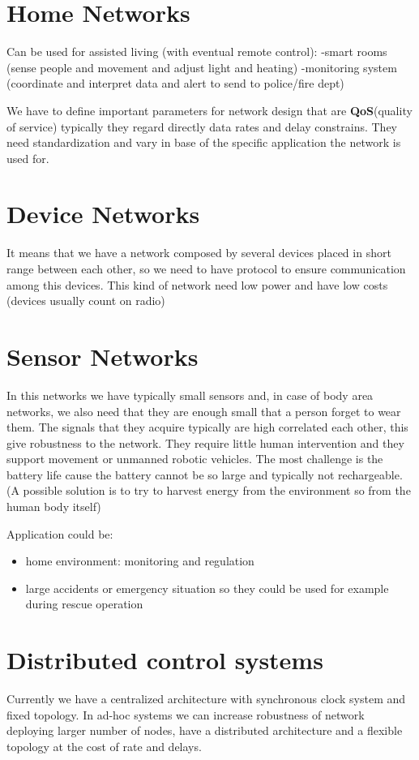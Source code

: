 \section{Home Networks}
Can be used for assisted living (with eventual remote control):
-smart rooms  (sense people and movement and adjust light and heating)
-monitoring system (coordinate and interpret data and alert to send to police/fire dept)

We have to define important parameters for network design that are \textbf{QoS}(quality of service) typically they regard directly data rates and delay constrains. They need standardization and vary in base of the specific application the network is used for.

\section{Device Networks}
It means that we have a network composed by several devices placed in short range between each other, so we need to have protocol to ensure communication among this devices. This kind of network need low power and have low costs (devices usually count on radio)

\section{Sensor Networks}
In this networks we have typically small sensors and, in case of body area networks, we also need that they are enough small that a person forget to wear them.
The signals that they acquire typically are high correlated each other, this give robustness to the network.
They require little human intervention and they support movement or unmanned robotic vehicles. The most challenge is the battery life cause the battery cannot be so large and typically not rechargeable. (A possible solution is to try to harvest energy from the environment so from the human body itself)

Application could be:
\begin{itemize}
\item home environment: monitoring and regulation
\item large accidents or emergency situation so they could be used for example during rescue operation
\end{itemize}

\section{Distributed control systems}
Currently we have a centralized architecture with synchronous clock system and fixed topology. In ad-hoc systems we can increase robustness of network deploying larger number of nodes, have a distributed architecture and a flexible topology at the cost of rate and delays.

